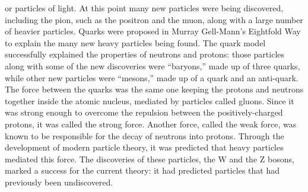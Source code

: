 or particles of light.  
At this point many new particles were being discovered, 
including the pion, 
such 
as the positron and the muon, 
along with a large number of heavier particles.  
Quarks were proposed in Murray Gell-Mann's Eightfold Way 
to explain the many new heavy particles 
being found. %
The quark model successfully explained the 
properties of neutrons and protons: 
those particles along with some of the new discoveries 
were ``baryons,'' made up of three quarks, 
while other new particles were ``mesons,'' 
made up of a quark and an anti-quark.  
The force between the quarks was the same one 
keeping the protons and neutrons together inside the 
atomic nucleus, 
mediated by particles called gluons.  
Since it was strong enough to overcome the repulsion 
between the positively-charged protons, 
it was called the strong force.  
Another force, called the weak force, 
was known to be responsible for the decay of 
neutrons into protons.  
Through the development of modern particle theory, 
it was predicted that heavy particles mediated this force.  
The discoveries of these particles, the W and the Z bosons, 
marked a success for the current theory: 
it had predicted particles that had previously been 
undiscovered.  

